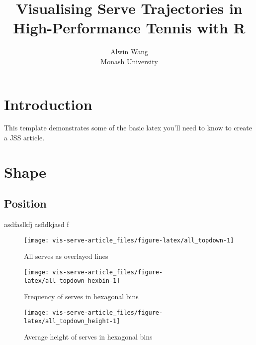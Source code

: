 \documentclass[article]{jss}
\author{
Alwin Wang\\Monash University
}
\title{Visualising Serve Trajectories in High-Performance Tennis with R}
\begin{document}
\section{Introduction}\label{introduction}

This template demonstrates some of the basic latex you'll need to know
to create a JSS article.

\section{Shape}\label{shape}

\subsection{Position}\label{position}

asdfaslkfj asfldkjasd f

\begin{CodeChunk}
\begin{figure}

{\centering \texttt{[image: vis-serve-article\_files/figure-latex/all\_topdown-1]} 

}

\caption[All serves as overlayed lines]{All serves as overlayed lines}\label{fig:all_topdown}
\end{figure}
\end{CodeChunk}

\begin{CodeChunk}
\begin{figure}

{\centering \texttt{[image: vis-serve-article\_files/figure-latex/all\_topdown\_hexbin-1]} 

}

\caption[Frequency of serves in hexagonal bins]{Frequency of serves in hexagonal bins}\label{fig:all_topdown_hexbin}
\end{figure}
\end{CodeChunk}

\begin{CodeChunk}
\begin{figure}

{\centering \texttt{[image: vis-serve-article\_files/figure-latex/all\_topdown\_height-1]} 

}

\caption[Average height of serves in hexagonal bins]{Average height of serves in hexagonal bins}\label{fig:all_topdown_height}
\end{figure}
\end{CodeChunk}
\end{document}
